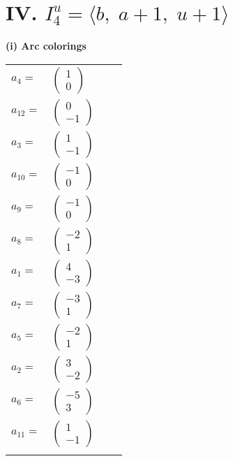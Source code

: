 \documentclass[1p]{elsarticle_modified}
\theoremstyle{definition}
\begin{document}
\centering \section*{IV. $I^u_{4}= \langle b,\;a+1,\;u+1 \rangle$}
\flushleft \textbf{(i) Arc colorings}\\
\begin{tabular}{m{7pt} m{180pt} m{7pt} m{180pt} }
\flushright $a_{4}=$&$\begin{pmatrix}1\\0\end{pmatrix}$ \\
\flushright $a_{12}=$&$\begin{pmatrix}0\\-1\end{pmatrix}$ \\
\flushright $a_{3}=$&$\begin{pmatrix}1\\-1\end{pmatrix}$ \\
\flushright $a_{10}=$&$\begin{pmatrix}-1\\0\end{pmatrix}$ \\
\flushright $a_{9}=$&$\begin{pmatrix}-1\\0\end{pmatrix}$ \\
\flushright $a_{8}=$&$\begin{pmatrix}-2\\1\end{pmatrix}$ \\
\flushright $a_{1}=$&$\begin{pmatrix}4\\-3\end{pmatrix}$ \\
\flushright $a_{7}=$&$\begin{pmatrix}-3\\1\end{pmatrix}$ \\
\flushright $a_{5}=$&$\begin{pmatrix}-2\\1\end{pmatrix}$ \\
\flushright $a_{2}=$&$\begin{pmatrix}3\\-2\end{pmatrix}$ \\
\flushright $a_{6}=$&$\begin{pmatrix}-5\\3\end{pmatrix}$ \\
\flushright $a_{11}=$&$\begin{pmatrix}1\\-1\end{pmatrix}$\\&\end{tabular}
\end{document}
